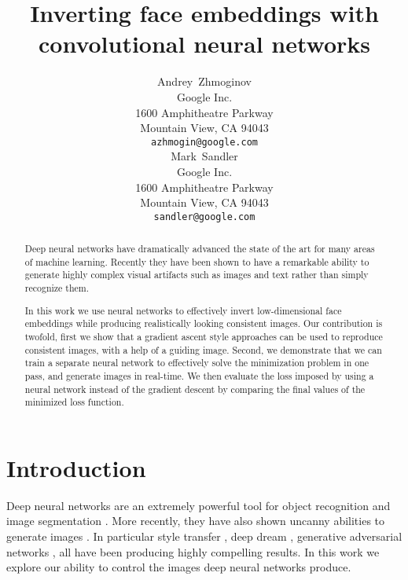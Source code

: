 \documentclass{article}
\title{Inverting face embeddings with convolutional neural networks}
\author{
  Andrey~Zhmoginov \\
  Google Inc. \\
  1600 Amphitheatre Parkway \\
  Mountain View, CA 94043 \\
  \texttt{azhmogin@google.com} \\
  \And
  Mark~Sandler \\
  Google Inc. \\
  1600 Amphitheatre Parkway \\
  Mountain View, CA 94043 \\
  \texttt{sandler@google.com} \\
}
\begin{document}
\maketitle

\begin{abstract}
  Deep neural networks have dramatically advanced the state of the art for many areas of machine learning. Recently they have been shown
  to have a remarkable ability to generate highly complex visual artifacts such as images and text rather than simply recognize them.

  In this work we use neural networks to effectively invert low-dimensional face embeddings while producing
  realistically looking consistent images.
  Our contribution is twofold, first we show that a gradient ascent style approaches can be used
  to reproduce consistent images, with a help of a guiding image.
  Second, we demonstrate that we can train a separate neural network to effectively
  solve the minimization problem in one pass, and generate images in real-time.
  We then evaluate the loss imposed by using a neural network
  instead of the gradient descent by comparing the final values of the minimized loss function.
\end{abstract}


\section{Introduction}
\label{sec:introduction}

Deep neural networks are an extremely powerful tool for object recognition \cite{krizhevsky2012imagenet,szegedy2015going,he:15,schroff:15} and image segmentation \cite{long2015fully}. More recently,
they have also shown uncanny abilities to generate images \cite{radford:15,dosovitskiy:14,gregor2015draw}. In particular style transfer \cite{gatys:15,Li2016Combining}, deep dream \cite{mordvintsev:15},
generative adversarial networks \cite{radford:15}, all have been producing highly compelling results. In this work we explore our ability to control the images deep neural networks produce.
\end{document}
